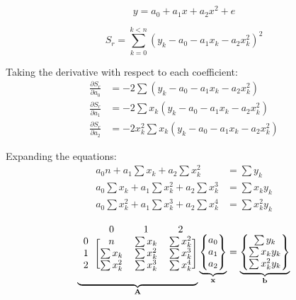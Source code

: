 \documentclass{../../KDHnotes}
\begin{document}
\begin{equation}
	y = a_0 + a_1x + a_2x^2 + e
\end{equation}

\begin{equation}
	S_r = \sum_{k=0}^{k<n} (y_k - a_0 - a_1x_k - a_2x_k^2)^2
\end{equation}



Taking the derivative with respect to each coefficient:
\begin{align}
	\frac{\partial S_r}{\partial a_0} &= -2 \sum (y_k - a_0 - a_1x_k - a_2 x_k^2)\\
	\frac{\partial S_r}{\partial a_1} &= -2 \sum x_k(y_k - a_0 - a_1x_k - a_2 x_k^2)\\
	\frac{\partial S_r}{\partial a_2} &= -2x_k^2 \sum x_k(y_k - a_0 - a_1x_k - a_2 x_k^2)
\end{align}


Expanding the equations:
\begin{align}
	a_0n + a_1 \sum x_k + a_2 \sum x_k^2 &= \sum y_k\\
	a_0\sum x_k + a_1 \sum x_k^2 + a_2 \sum x_k^3 &= \sum x_k y_k\\
	a_0 \sum x_k^2 + a_1 \sum x_k^3 + a_2 \sum x_k^4 &= \sum x_k^2 y_k
\end{align}

\begin{equation}
\underbrace{
	\begin{blockarray}{cccc}
	& 0 & 1 & 2\\
	\begin{block}{c[ccc]}
	0 & n & \sum x_k & \sum x_k^2\\
	1 & \sum x_k & \sum x_k^2 & \sum x_k^3\\
	2 & \sum x_k^2 & \sum x_k^3 & \sum x_k^4\\
	\end{block}
	\end{blockarray}
}_{\vec{A}}
\underbrace{
	\begin{Bmatrix}
		a_0\\ a_1\\ a_2
	\end{Bmatrix}
}_{\vec{x}}
	=
\underbrace{
	\begin{Bmatrix}
		\sum y_k\\ 
		\sum x_k y_k\\
		\sum x_k^2 y_k
	\end{Bmatrix}
}_{\vec{b}}
\end{equation}
\end{document}
